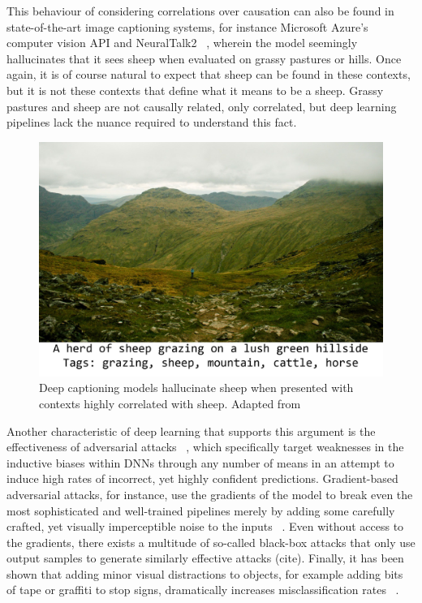 	This behaviour of considering correlations over causation can also be found in state-of-the-art image captioning systems, for instance Microsoft Azure's computer vision API and NeuralTalk2 ~\cite{electric_sheep}, wherein the model seemingly hallucinates that it sees sheep when evaluated on grassy pastures or hills. Once again, it is of course natural to expect that sheep can be found in these contexts, but it is not these contexts that define what it means to be a sheep. Grassy pastures and sheep are not causally related, only correlated, but deep learning pipelines lack the nuance required to understand this fact. 
	\begin{figure}[h]
		\includegraphics[width=\linewidth]{illustrations/sheep.jpg}
		\caption{Deep captioning models hallucinate sheep when presented with contexts highly correlated with sheep. Adapted from ~\cite{electric_sheep}}
		\label{sheep}
	\end{figure}


	Another characteristic of deep learning that supports this argument is the effectiveness of adversarial attacks ~\cite{adversarial_bugs_features}, which specifically target weaknesses in the inductive biases within DNNs through any number of means in an attempt to induce high rates of incorrect, yet highly confident predictions. Gradient-based adversarial attacks, for instance, use the gradients of the model to break even the most sophisticated and well-trained pipelines merely by adding some carefully crafted, yet visually imperceptible noise to the inputs ~\cite{adversarial_attacks}. Even without access to the gradients, there exists a multitude of so-called black-box attacks that only use output samples to generate similarly effective attacks (cite). Finally, it has been shown that adding minor visual distractions to objects, for example adding bits of tape or graffiti to stop signs, dramatically increases misclassification rates ~\cite{physical_attacks}. 
	
